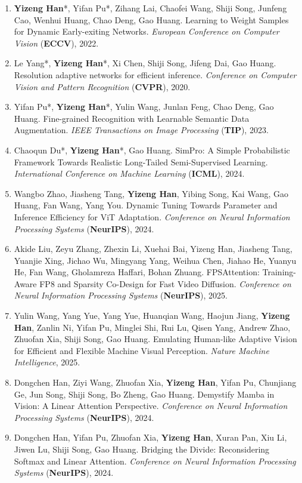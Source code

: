\documentclass[10.5pt, UTF8]{ctexart}
\makeatletter
\newlength{\bibhang}
\newlength{\bibsep}
 {\@listi \global\bibsep\itemsep \global\advance\bibsep by\parsep}
\newenvironment{bibsection}%
        {\begin{enumerate}{%
       \setlength{\leftmargin}{-2em}%
       \setlength{\itemindent}{-2em}%
       \setlength{\itemsep}{\bibsep}%
        \setlength{\partopsep}{0pt}%
        \setlength{\topsep}{0pt}}}
        {\end{enumerate}\vspace{-.6\baselineskip}}
\makeatother
\begin{document}
\begin{sloppypar}
\begin{bibsection}
        \item \textbf{Yizeng Han}*, {Yifan Pu*}, Zihang Lai, Chaofei Wang, Shiji Song, Junfeng Cao, Wenhui Huang, Chao Deng, Gao Huang. Learning to Weight Samples for Dynamic Early-exiting Networks. \emph{European Conference on Computer Vision} (\textbf{ECCV}), 2022.
        \item {Le Yang*}, \textbf{Yizeng Han}*, Xi Chen, Shiji Song, Jifeng Dai, Gao Huang. Resolution adaptive networks for efficient inference. \emph{Conference on Computer Vision and Pattern Recognition} (\textbf{CVPR}), 2020.
        \item Yifan Pu*, \textbf{Yizeng Han}*,  Yulin Wang, Junlan Feng, Chao Deng, Gao Huang. Fine-grained Recognition with Learnable Semantic Data Augmentation. \emph{IEEE Transactions on Image Processing} (\textbf{TIP}), 2023.
        \item Chaoqun Du*, \textbf{Yizeng Han}*, Gao Huang. SimPro: A Simple Probabilistic Framework Towards Realistic Long-Tailed Semi-Supervised Learning. \emph{International Conference on Machine Learning} (\textbf{ICML}), 2024.
        \item Wangbo Zhao, Jiasheng Tang, \textbf{Yizeng Han}, Yibing Song, Kai Wang, Gao Huang, Fan Wang, Yang You. Dynamic Tuning Towards Parameter and Inference Efficiency for ViT Adaptation. \emph{Conference on Neural Information Processing Systems} (\textbf{NeurIPS}), 2024.
        \item Akide Liu, Zeyu Zhang, Zhexin Li, Xuehai Bai, Yizeng Han, Jiasheng Tang, Yuanjie Xing, Jichao Wu, Mingyang Yang, Weihua Chen, Jiahao He, Yuanyu He, Fan Wang, Gholamreza Haffari, Bohan Zhuang. FPSAttention: Training-Aware FP8 and Sparsity Co-Design for Fast Video Diffusion. \emph{Conference on Neural Information Processing Systems} (\textbf{NeurIPS}), 2025.
        \item Yulin Wang, Yang Yue, Yang Yue, Huanqian Wang, Haojun Jiang, \textbf{Yizeng Han}, Zanlin Ni, Yifan Pu, Minglei Shi, Rui Lu, Qisen Yang, Andrew Zhao, Zhuofan Xia, Shiji Song, Gao Huang. Emulating Human-like Adaptive Vision for Efficient and Flexible Machine Visual Perception. \emph{Nature Machine Intelligence}, 2025.
        \item Dongchen Han, Ziyi Wang, Zhuofan Xia, \textbf{Yizeng Han}, Yifan Pu, Chunjiang Ge, Jun Song, Shiji Song, Bo Zheng, Gao Huang. Demystify Mamba in Vision: A Linear Attention Perspective. \emph{Conference on Neural Information Processing Systems} (\textbf{NeurIPS}), 2024.
        \item Dongchen Han, Yifan Pu, Zhuofan Xia, \textbf{Yizeng Han}, Xuran Pan, Xiu Li, Jiwen Lu, Shiji Song, Gao Huang. Bridging the Divide: Reconsidering Softmax and Linear Attention. \emph{Conference on Neural Information Processing Systems} (\textbf{NeurIPS}), 2024.

\end{bibsection}
\end{sloppypar}
\end{document}
